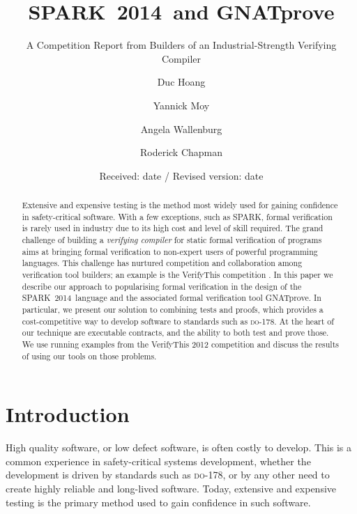 \documentclass[sttt,final]{svjour}
\newcommand{\DO}{\textsc{do-178}}
\newcommand{\gnatprove}{GNATprove\xspace}
\newcommand{\newspark}{SPARK~2014\xspace}
\begin{document}
%
\title{\newspark\ and \gnatprove}
\subtitle{A Competition Report from Builders of an Industrial-Strength Verifying Compiler}
\author{Duc Hoang \and Yannick Moy \and Angela Wallenburg \and Roderick Chapman
}                     %

\date{Received: date / Revised version: date}
%
\maketitle
%
\begin{abstract}
  Extensive and expensive testing is the meth\-od most widely used for
  gaining confidence in safety-critical software. With a few
  exceptions, such as SPARK, formal verification is rarely used in
  industry due to its high cost and level of skill required. The grand
  challenge of building a \emph{verifying compiler} for static formal
  verification of programs aims at bringing formal verification to
  non-expert users of powerful programming languages. This challenge
  has nurtured competition and collaboration among verification tool
  builders; an example is the VerifyThis competition
  \cite{verifythis2012}. In this paper we describe our approach to
  popularising formal verification in the design of the
  \newspark\ language and the associated formal verification tool
  \gnatprove. In particular, we present our solution to combining
  tests and proofs, which provides a cost-competitive way to develop
  software to standards such as \DO.  At the heart of our technique are
  executable contracts, and the ability to both test and prove
  those. We use running examples from the VerifyThis 2012 competition
  and discuss the results of using our tools on those problems.
\end{abstract}
%
\section{Introduction}
\label{intro}
High quality software, or low defect software, is often costly to
develop. This is a common experience in safety-critical systems
development, whether the development is driven by standards such as
\DO, or by any other need to create highly reliable and long-lived
software. Today, extensive and expensive testing is the primary method
used to gain confidence in such software.
\end{document}
